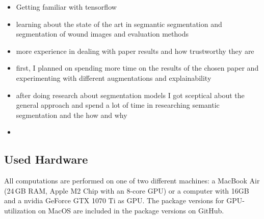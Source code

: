 \begin{itemize}
	\item Getting familiar with tensorflow
	\item learning about the state of the art in segmantic segmentation and segmentation of wound images and evaluation methods
	\item more experience in dealing with paper results and how trustworthy they are
	\item first, I planned on spending more time on the results of the chosen paper and experimenting with different augmentations and explainability
	\item after doing research about segmentation models I got sceptical about the general approach and spend a lot of time in researching semantic segmentation and the how and why
	\item 
\end{itemize}


\subsection{Used Hardware}

All computations are performed on one of two different machines: a MacBook Air (24\,GB RAM, Apple M2 Chip with an 8-core GPU) or a computer with 16GB and a nvidia GeForce GTX 1070 Ti as GPU. The package versions for GPU-utilization on MacOS are included in the package versions on GitHub.

